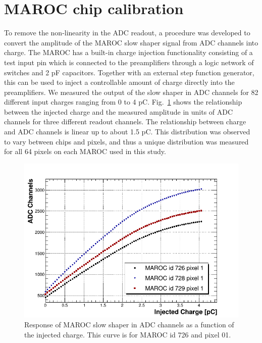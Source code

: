 \section{MAROC chip calibration}

To remove the non-linearity in the ADC readout, a procedure was developed to convert the amplitude of the MAROC slow shaper signal from ADC channels into charge. The MAROC has a built-in charge injection functionality consisting of a test input pin which is connected to the preamplifiers through a logic network of switches and 2 pF capacitors. Together with an external step function generator, this can be used to inject a controllable amount of charge directly into the preamplifiers. We measured the output of the slow shaper in ADC channels for 82 different input charges ranging from 0 to 4 pC. Fig.~\ref{fig:MAROCcalib} shows the relationship between the injected charge and the measured amplitude in units of ADC channels for three different readout channels. The relationship between charge and ADC channels is linear up to about 1.5 pC. This distribution was observed to vary between chips and pixels, and thus a unique distribution was measured for all 64 pixels on each MAROC used in this study. 

\begin{figure}[hbt]
	\centering
	\includegraphics[width=\linewidth]{figures/adc_v_charge.png}
	\caption{Response of MAROC slow shaper in ADC channels as a function of the injected charge. This curve is for MAROC id 726 and pixel 01.}
	\label{fig:MAROCcalib}
\end{figure}


